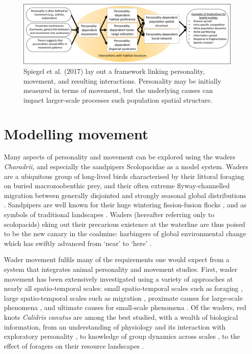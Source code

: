\begin{figure}

    \includegraphics[width=0.7\linewidth]{fig01_spiegel_etal_2017.png}
    \caption{Spiegel et al. (2017) lay out a framework linking personality,
  movement, and resulting interactions. Personality may be initially
  measured in terms of movement, but the underlying causes can impact
  larger-scale processes such population spatial
  structure.}
    \label{fig:fig01_spiegel_etal_2017}
\end{figure}

\section{Modelling movement}

Many aspects of personality and movement can be explored using the waders \emph{Charadrii,} and especially the sandpipers Scolopacidae as a model system. Waders are a ubiquitous group of long-lived birds characterised by their littoral foraging on buried macrozoobenthic prey, and their often extreme flyway-channelled migration between generally disjointed and strongly seasonal global distributions \citep{boere2006a, gill2009, piersma2019}. Sandpipers are well known for their huge wintering fission-fusion flocks \citep{myers1983, conklin2008}, and as symbols of traditional landscapes \citep{colwell2018}. Waders (hereafter referring only to scolopacids) eking out their precarious existence at the waterline are thus poised to be the new canary in the coalmine: harbingers of global environmental change \citep{piersma2004, wikelski2016, fitzpatrick2018} which has swiftly advanced from `near' to `here' \citep{ipcc2018}. 

Wader movement fulfils many of the requirements one would expect from a system that integrates animal personality and movement studies. First, wader movement has been extensively investigated using a variety of approaches at nearly all spatio-temporal scales: small spatio-temporal scales such as foraging \citep{vangils2003, vangils2010}, large spatio-temporal scales such as migration \citep{buehler2006, piersma2011}, proximate causes for large-scale phenomena \citep{lank2003, ydenberg2004, ruthrauff2013, ruthrauff2018}, and ultimate causes for small-scale phenomena \citep{vangils2006, kraan2009}. Of the waders, red knots \emph{Calidris canutus} are among the best studied, with a wealth of biological information, from an understanding of physiology and its interaction with exploratory personality \citep{bijleveld2014, mathot2017}, to knowledge of group dynamics across scales \citep{bijleveld2010, bijleveld2012a, bijleveld2015b}, to the effect of foragers on their resource landscapes \citep{bijleveld2015c}.

